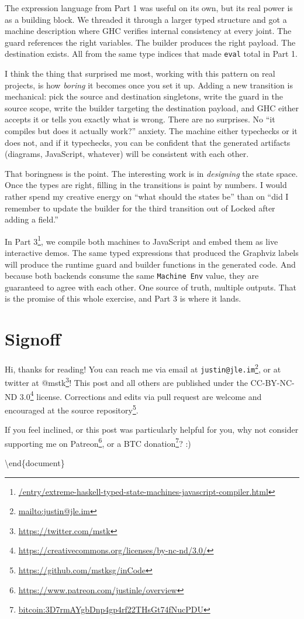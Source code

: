 \documentclass[]{article}
\renewcommand{\href}[2]{#2\footnote{\url{#1}}}
\begin{document}
The expression language from Part 1 was useful on its own, but its real power is
as a building block. We threaded it through a larger typed structure and got a
machine description where GHC verifies internal consistency at every joint. The
guard references the right variables. The builder produces the right payload.
The destination exists. All from the same type indices that made \texttt{eval}
total in Part 1.

I think the thing that surprised me most, working with this pattern on real
projects, is how \emph{boring} it becomes once you set it up. Adding a new
transition is mechanical: pick the source and destination singletons, write the
guard in the source scope, write the builder targeting the destination payload,
and GHC either accepts it or tells you exactly what is wrong. There are no
surprises. No ``it compiles but does it actually work?'' anxiety. The machine
either typechecks or it does not, and if it typechecks, you can be confident
that the generated artifacts (diagrams, JavaScript, whatever) will be consistent
with each other.

That boringness is the point. The interesting work is in \emph{designing} the
state space. Once the types are right, filling in the transitions is paint by
numbers. I would rather spend my creative energy on ``what should the states
be'' than on ``did I remember to update the builder for the third transition out
of Locked after adding a field.''

In
\href{/entry/extreme-haskell-typed-state-machines-javascript-compiler.html}{Part
3}, we compile both machines to JavaScript and embed them as live interactive
demos. The same typed expressions that produced the Graphviz labels will produce
the runtime guard and builder functions in the generated code. And because both
backends consume the same \texttt{Machine\ Env} value, they are guaranteed to
agree with each other. One source of truth, multiple outputs. That is the
promise of this whole exercise, and Part 3 is where it lands.

\section{Signoff}\label{signoff}

Hi, thanks for reading! You can reach me via email at
\href{mailto:justin@jle.im}{\nolinkurl{justin@jle.im}}, or at twitter at
\href{https://twitter.com/mstk}{@mstk}! This post and all others are published
under the \href{https://creativecommons.org/licenses/by-nc-nd/3.0/}{CC-BY-NC-ND
3.0} license. Corrections and edits via pull request are welcome and encouraged
at \href{https://github.com/mstksg/inCode}{the source repository}.

If you feel inclined, or this post was particularly helpful for you, why not
consider \href{https://www.patreon.com/justinle/overview}{supporting me on
Patreon}, or a \href{bitcoin:3D7rmAYgbDnp4gp4rf22THsGt74fNucPDU}{BTC donation}?
:)

\textbackslash end\{document\}
\end{document}
